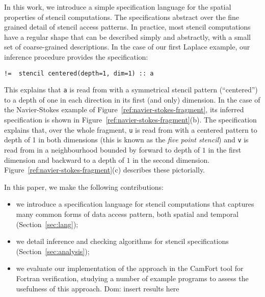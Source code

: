 \documentclass[9pt]{sigplanconf}
\newcommand{\dnote}[1]{\textcolor{darkpurple}{Dom: #1}}
\theoremstyle{definition}
\begin{document}
In this work, we introduce a simple specification language for the
spatial properties of stencil computations. The
specifications abstract over the fine grained detail of stencil access
patterns. In practice, most stencil computations have a regular shape
that can be described simply and abstractly, with a small set of
coarse-grained descriptions. In the case of our first Laplace example,
our inference procedure provides the specification:
%
\begin{verbatim}
!=  stencil centered(depth=1, dim=1) :: a
\end{verbatim}
%
This explains that \texttt{a} is read from with a
symmetrical stencil pattern (``centered'') to a depth of one in each
direction in its first (and only) dimension.
In the case of the Navier-Stokes example of
Figure~\ref{ref:navier-stokes-fragment}, its inferred specification is shown
in Figure~\ref{ref:navier-stokes-fragment}(b). The
specification explains that, over the whole fragment, \texttt{u} is
read from with a centered pattern to depth of 1 in both dimensions
(this is known as the \emph{five point stencil}) and \texttt{v}
is read from in a neighbourhood bounded by forward to depth of $1$ in
the first dimension and backward to a depth of $1$ in the second
dimension. Figure~\ref{ref:navier-stokes-fragment}(c) describes these
pictorially.

In this paper, we make the following contributions:
%
\begin{itemize}
\item we introduce a specification language for
stencil computations that captures many common forms
of data access pattern, both spatial and temporal (Section~\ref{sec:lang});
\item we detail inference and checking
algorithms for stencil specifications (Section~\ref{sec:analysis});
\item we evaluate our implementation of the approach
in the CamFort tool for Fortran verification, studying
a number of example programs to assess the usefulness
of this approach.
\dnote{insert results here}
\end{itemize}
%
\end{document}
